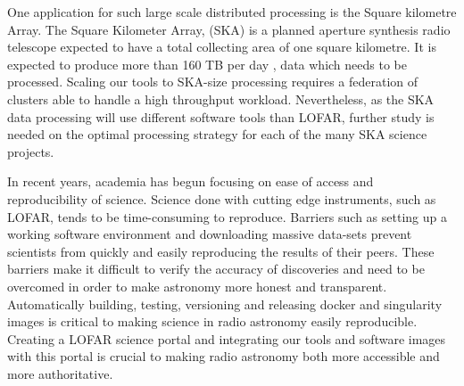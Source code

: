 One application for such large scale distributed processing is the Square kilometre Array. The Square Kilometer Array, (SKA) is a planned aperture synthesis radio telescope expected to have a total collecting area of one square kilometre. It is expected to produce more than 160 TB per day \citep{johnston2017taming}, data which needs to be processed. Scaling our tools to SKA-size processing requires a federation of clusters able to handle a high throughput workload. Nevertheless, as the SKA data processing will use different software tools than LOFAR, further study is needed on the optimal processing strategy for each of the many SKA science projects.

In recent years, academia has begun focusing on ease of access and reproducibility of science. Science done with cutting edge instruments, such as LOFAR, tends to be time-consuming to reproduce. Barriers such as setting up a working software environment and downloading massive data-sets prevent scientists from quickly and easily reproducing the results of their peers. These barriers make it difficult to verify the accuracy of discoveries and need to be overcomed in order to make astronomy more honest and transparent. Automatically building, testing, versioning and releasing docker and singularity images is critical to making science in radio astronomy easily reproducible. Creating a LOFAR science portal and integrating our tools and software images with this portal is crucial to making radio astronomy both more accessible and more authoritative.
